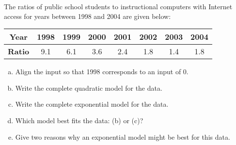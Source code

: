 \documentclass[notes]{subfiles}
\begin{document}
		\begin{ex}
			The ratios of public school students to instructional computers with Internet access for years between 1998 and 2004 are given below:
				\begin{center}
					{\renewcommand{\arraystretch}{1.2}
					\begin{tabular}{|c||c|c|c|c|c|c|c|}\hline
						\textbf{Year} & 1998 & 1999 & 2000 & 2001 & 2002 & 2003 & 2004 \\ \hline
						\textbf{Ratio} & 9.1 & 6.1 & 3.6 & 2.4 & 1.8 & 1.4 & 1.8\\ \hline
					\end{tabular}
					}
				\end{center}
				\begin{enumerate}[(a)]
					\item Align the input so that 1998 corresponds to an input of 0.
					\item Write the complete quadratic model for the data.
					\item Write the complete exponential model for the data.
					\item Which model best fits the data: (b) or (c)?
					\item Give two reasons why an exponential model might be best for this data.
				\end{enumerate}
		\end{ex}
\end{document}
